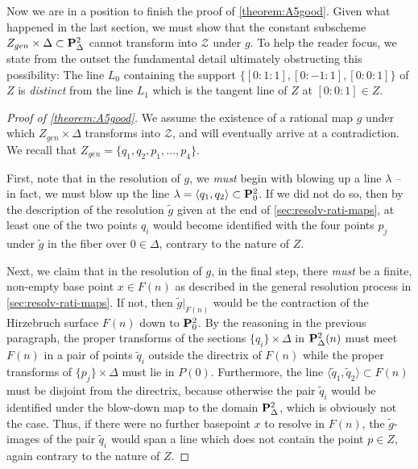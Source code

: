\documentclass[12pt,reqno]{amsart}
\numberwithin{equation}{section}
\newcommand{\td}{\widetilde}
\begin{document}
Now we are in a position to finish the proof of
\autoref{theorem:A5good}.  Given what happened in the last section, we
must show that the constant subscheme
$Z_{gen} \times \Delta \subset \P^{2}_{\Delta}$ cannot transform into
$\mathcal{Z}$ under $g$.  To help the reader focus, we state from the
outset the fundamental detail ultimately obstructing this possibility:
The line $L_0$ containing the support $\{[0:1:1], [0:-1:1], [0:0:1]\}$
of $Z$ is {\sl distinct} from the line $L_1$ which is the tangent line
of $Z$ at $[0:0:1] \in Z$.

\begin{proof}[Proof of \autoref{theorem:A5good}]
  We assume the existence of a rational map $g$ under which
  $Z_{gen} \times \Delta$ transforms into $\mathcal{Z}$, and will
  eventually arrive at a contradiction.  We recall that
  $Z_{gen} = \{q_1, q_2, p_1, \dots, p_4\}$.

  First, note that in the resolution of $g$, we {\sl must} begin with
  blowing up a line $\lambda$ -- in fact, we must blow up the line
  $\lambda = \langle q_{1}, q_{2} \rangle \subset \P^{2}_{0}$.  If we
  did not do so, then by the description of the resolution $\td{g}$
  given at the end of \autoref{sec:resolv-rati-maps}, at least one of
  the two points $q_{i}$ would become identified with the four points
  $p_{j}$ under $\td{g}$ in the fiber over $0 \in \Delta$, contrary to
  the nature of $Z$.

  Next, we claim that in the resolution of $g$, in the final step,
  there {\sl must} be a finite, non-empty base point $x \in F(n)$ as
  described in the general resolution process in
  \autoref{sec:resolv-rati-maps}.  If not, then $\td{g}\big|_{F(n)}$
  would be the contraction of the Hirzebruch surface $F(n)$ down to
  $\P^{2}_{0}$.  By the reasoning in the previous paragraph, the
  proper transforms of the sections $\{q_{i}\} \times \Delta$ in
  $\P^{2}_{\Delta}(n)$ must meet $F(n)$ in a pair of points
  $\td{q}_{i}$ outside the directrix of $F(n)$ while the proper
  transforms of $\{p_{j}\} \times \Delta$ must lie in
  $P(0)$. Furthermore, the line
  $\langle \td{q}_{1}, \td{q}_{2} \rangle \subset F(n)$ must be
  disjoint from the directrix, because otherwise the pair $\td{q}_{i}$
  would be identified under the blow-down map to the domain
  $\P^{2}_{\Delta}$, which is obviously not the case.  Thus, if there
  were no further basepoint $x$ to resolve in $F(n)$, the
  $\td{g}$-images of the pair $\td{q}_{i}$ would span a line which
  does not contain the point $p \in Z$, again contrary to the nature
  of $Z$.


\end{proof}
\end{document}

